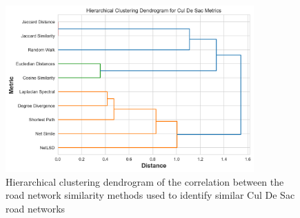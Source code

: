 \begin{figure}[!ht]
\centering
\includegraphics[width=0.85\textwidth,center]{picture/Cul De Sac/culdesac_metrics_dendrogram.png}
\caption[Hierarchical Clustering Dendrogram of the Correlation between the Cul De Sac Network Similarity Methods for Cul De Sac Road Networks]{Hierarchical clustering dendrogram of the correlation between the road network similarity methods used to identify similar Cul De Sac road networks}
\label{fig:Hierarchical Clustering Dendrogram of the Correlation between the Road Network Similarity Methods for Cul De Sac Road Networks}
\end{figure}
